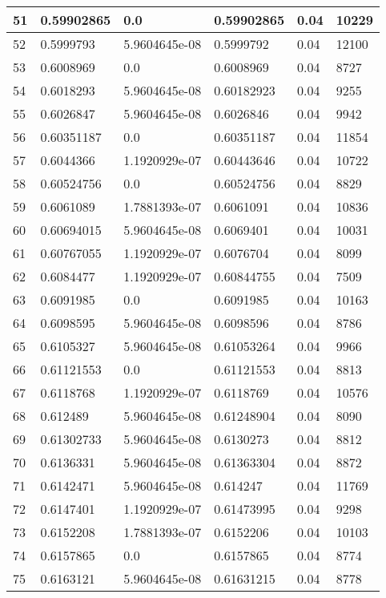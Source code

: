 \begin{longtable}{|l|l|l|l|l|l|}
51 & 0.59902865 & 0.0 & 0.59902865 & 0.04 & 10229 \\ \hline 
52 & 0.5999793 & 5.9604645e-08 & 0.5999792 & 0.04 & 12100 \\ \hline 
53 & 0.6008969 & 0.0 & 0.6008969 & 0.04 & 8727 \\ \hline 
54 & 0.6018293 & 5.9604645e-08 & 0.60182923 & 0.04 & 9255 \\ \hline 
55 & 0.6026847 & 5.9604645e-08 & 0.6026846 & 0.04 & 9942 \\ \hline 
56 & 0.60351187 & 0.0 & 0.60351187 & 0.04 & 11854 \\ \hline 
57 & 0.6044366 & 1.1920929e-07 & 0.60443646 & 0.04 & 10722 \\ \hline 
58 & 0.60524756 & 0.0 & 0.60524756 & 0.04 & 8829 \\ \hline 
59 & 0.6061089 & 1.7881393e-07 & 0.6061091 & 0.04 & 10836 \\ \hline 
60 & 0.60694015 & 5.9604645e-08 & 0.6069401 & 0.04 & 10031 \\ \hline 
61 & 0.60767055 & 1.1920929e-07 & 0.6076704 & 0.04 & 8099 \\ \hline 
62 & 0.6084477 & 1.1920929e-07 & 0.60844755 & 0.04 & 7509 \\ \hline 
63 & 0.6091985 & 0.0 & 0.6091985 & 0.04 & 10163 \\ \hline 
64 & 0.6098595 & 5.9604645e-08 & 0.6098596 & 0.04 & 8786 \\ \hline 
65 & 0.6105327 & 5.9604645e-08 & 0.61053264 & 0.04 & 9966 \\ \hline 
66 & 0.61121553 & 0.0 & 0.61121553 & 0.04 & 8813 \\ \hline 
67 & 0.6118768 & 1.1920929e-07 & 0.6118769 & 0.04 & 10576 \\ \hline 
68 & 0.612489 & 5.9604645e-08 & 0.61248904 & 0.04 & 8090 \\ \hline 
69 & 0.61302733 & 5.9604645e-08 & 0.6130273 & 0.04 & 8812 \\ \hline 
70 & 0.6136331 & 5.9604645e-08 & 0.61363304 & 0.04 & 8872 \\ \hline 
71 & 0.6142471 & 5.9604645e-08 & 0.614247 & 0.04 & 11769 \\ \hline 
72 & 0.6147401 & 1.1920929e-07 & 0.61473995 & 0.04 & 9298 \\ \hline 
73 & 0.6152208 & 1.7881393e-07 & 0.6152206 & 0.04 & 10103 \\ \hline 
74 & 0.6157865 & 0.0 & 0.6157865 & 0.04 & 8774 \\ \hline 
75 & 0.6163121 & 5.9604645e-08 & 0.61631215 & 0.04 & 8778 \\ \hline 
\end{longtable}